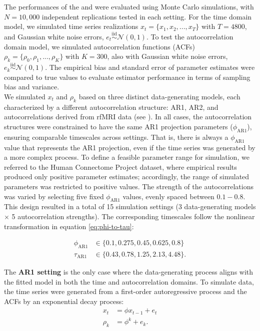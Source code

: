 \documentclass[main.tex]{subfiles}
\begin{document}
The performances of the  and  were evaluated using Monte Carlo simulations, with $N = 10,000$ independent replications tested in each setting. For the time domain model, we simulated time series realizations $x_t = \{x_1, x_2, ..., x_T\}$ with $T=4800$, and Gaussian white noise errors, $e_t \overset{\text{iid}}{\sim} \mathcal{N}(0, 1)$. To test the autocorrelation domain model, we simulated autocorrelation functions (ACFs) $\rho_k = \{\rho_0, \rho_1, ..., \rho_K\}$ with $K=300$, also with Gaussian white noise errors, $e_k \overset{\text{iid}}{\sim} \mathcal{N}(0, 1)$. The empirical bias and standard error of parameter estimates were compared to true values to evaluate estimator performance in terms of sampling bias and variance.\\

We simulated $x_t$ and $\rho_k$ based on three distinct data-generating models, each characterized by a different autocorrelation structure: AR1, AR2, and autocorrelations derived from rfMRI data (see ). In all cases, the autocorrelation structures were constrained to have the same AR1 projection parameters ($\phi_\text{AR1}$), ensuring comparable timescales across settings. That is, there is always a $\phi_\text{AR1}$ value that represents the AR1 projection, even if the time series was generated by a more complex process. To define a feasible parameter range for simulation, we referred to the Human Connectome Project dataset, where empirical results produced only positive parameter estimates; accordingly, the range of simulated parameters was restricted to positive values. The strength of the autocorrelations was varied by selecting five fixed $\phi_\text{AR1}$ values, evenly spaced between $0.1 - 0.8$. This design resulted in a total of 15 simulation settings (3 data-generating models $\times$ 5 autocorrelation strengths). The corresponding timescales follow the nonlinear transformation in equation \eqref{eq:phi-to-tau}:

\begin{align}
    \phi_\text{AR1} &\in \{0.1, 0.275, 0.45, 0.625, 0.8\} \label{eq:tau-ar1}\\
    \tau_\text{AR1} &\in \{0.43, 0.78, 1.25, 2.13, 4.48\}.
\end{align}


The \textbf{AR1 setting} is the only case where the data-generating process aligns with the fitted model in both the time and autocorrelation domains. To simulate data, the time series were generated from a first-order autoregressive process and the ACFs by an exponential decay process:
\begin{align}
    x_t &= \phi x_{t-1} + e_t\\
    \rho_k &= \phi^k + e_k.
\end{align}
\end{document}
